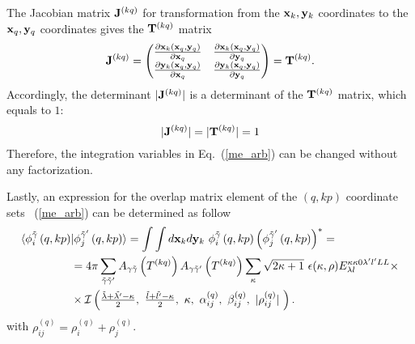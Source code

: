 \documentclass[
12pt, %
oneside, %
english, %
onehalfspacing, %
onehalfspacing, %
headsepline, %
]{MastersDoctoralThesis} %
\begin{document}
The Jacobian  matrix ${\bf J}^{(kq)}$ for transformation from the ${\bf x}_k, {\bf y}_k$ coordinates to the ${\bf x}_q, {\bf y}_q$ coordinates gives the ${\bf T}^{(kq)}$ matrix
\begin{equation}
{\bf J}^{(kq)} = 
\begin{pmatrix}
\frac{\partial {\bf x}_k \left({\bf x}_q,{\bf y}_q \right)}{ \partial {\bf x}_q }  
& \frac{\partial {\bf x}_k \left({\bf x}_q,{\bf y}_q \right)}{ \partial {\bf y}_q } \\
\frac{\partial {\bf y}_k \left({\bf x}_q,{\bf y}_q \right)}{ \partial {\bf x}_q }  
& \frac{\partial {\bf y}_k \left({\bf x}_q,{\bf y}_q \right)}{ \partial {\bf y}_q } 
\end{pmatrix} = {\bf T}^{(kq)}.
\end{equation}
Accordingly, the determinant $\vert {\bf J}^{(kq)} \vert$ is a determinant of the ${\bf T}^{(kq)}$ matrix, which equals to $1$:
\begin{equation}
\vert {\bf J}^{(kq)} \vert = \vert {\bf T}^{(kq)} \vert =1
\end{equation}
  Therefore, the integration variables in Eq.~(\ref{me_arb}) can be changed without any factorization. 
  
  Lastly, an expression for the overlap matrix element of the $(q,kp)$ coordinate sets ~(\ref{me_arb}) can be determined as follow
\begin{align}
\langle \phi_{i}^{\tilde{\gamma}}\left(q,kp \right) & \vert 
\phi_{j}^{\tilde{\gamma}^{\prime}}\left(q,kp \right) \rangle =
\int \int d{\bf x}_k d{\bf y}_k  ~\phi_{i}^{\tilde{\gamma}}\left(q,kp \right) \left( \phi_{j}^{\tilde{\gamma}^{\prime}}\left(q,kp \right) \right)^{*}  = \nonumber 
\\ & = 4 \pi \sum_{\tilde{\gamma}\tilde{\gamma}^{\prime}}  A_{\gamma\tilde{\gamma}}\left( T^{(kq)} \right) A_{\gamma\tilde{\gamma}^{\prime}}\left( T^{(kq)} \right)
 \sum_{\kappa} \sqrt{2\kappa+1}~ \epsilon(\kappa, \rho) {E}^{\kappa \kappa 0 \lambda^{\prime} l^{\prime} L L}_{\lambda l} \times  \nonumber \\
 &\times \mathcal{I}\left(
 \tfrac{\tilde{\lambda}+\tilde{\lambda^{\prime}}-\kappa}{2}, ~
 \tfrac{\tilde{l}+\tilde{l^{\prime}}-\kappa}{2},~
 \kappa,~
 \alpha^{(q)}_{ij},~
 \beta^{(q)}_{ij} ,~
 \vert \rho^{(q)}_{ij} \vert ~
  \right).
\end{align}
with $\rho_{ij}^{(q)}=\rho_{i}^{(q)}+\rho_{j}^{(q)}$.
\end{document}
